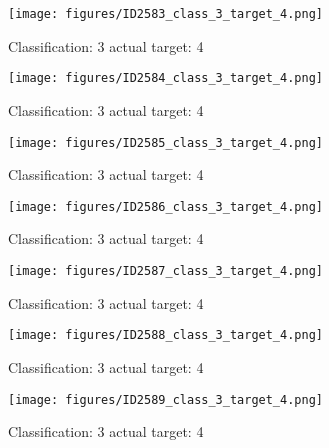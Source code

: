 \begin{figure}[h!]
\begin{center}
\texttt{[image: figures/ID2583\_class\_3\_target\_4.png]}
\end{center}
\caption{ Classification: 3 actual target: 4}
\label{fig:ID2583_class_3_target_4}
\end{figure}
\begin{figure}[h!]
\begin{center}
\texttt{[image: figures/ID2584\_class\_3\_target\_4.png]}
\end{center}
\caption{ Classification: 3 actual target: 4}
\label{fig:ID2584_class_3_target_4}
\end{figure}
\begin{figure}[h!]
\begin{center}
\texttt{[image: figures/ID2585\_class\_3\_target\_4.png]}
\end{center}
\caption{ Classification: 3 actual target: 4}
\label{fig:ID2585_class_3_target_4}
\end{figure}
\begin{figure}[h!]
\begin{center}
\texttt{[image: figures/ID2586\_class\_3\_target\_4.png]}
\end{center}
\caption{ Classification: 3 actual target: 4}
\label{fig:ID2586_class_3_target_4}
\end{figure}
\begin{figure}[h!]
\begin{center}
\texttt{[image: figures/ID2587\_class\_3\_target\_4.png]}
\end{center}
\caption{ Classification: 3 actual target: 4}
\label{fig:ID2587_class_3_target_4}
\end{figure}
\begin{figure}[h!]
\begin{center}
\texttt{[image: figures/ID2588\_class\_3\_target\_4.png]}
\end{center}
\caption{ Classification: 3 actual target: 4}
\label{fig:ID2588_class_3_target_4}
\end{figure}
\begin{figure}[h!]
\begin{center}
\texttt{[image: figures/ID2589\_class\_3\_target\_4.png]}
\end{center}
\caption{ Classification: 3 actual target: 4}
\label{fig:ID2589_class_3_target_4}
\end{figure}
